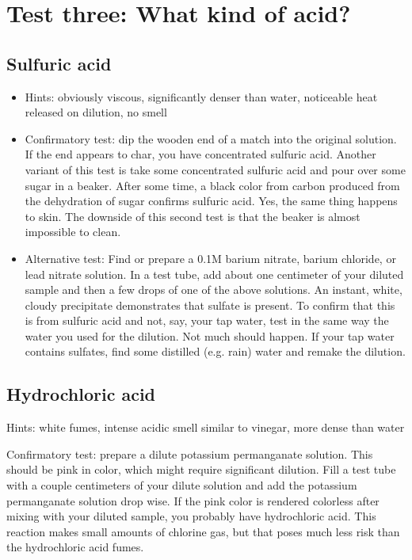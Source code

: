 \section{Test three: What kind of acid?}

\subsection{Sulfuric acid}
\begin{itemize}
\item{Hints: obviously viscous, 
significantly denser than water, 
noticeable heat released on dilution, 
no smell}

\item{Confirmatory test: dip the wooden end of a match into the original solution. 
If the end appears to char, 
you have concentrated sulfuric acid. 
Another variant of this test is take some concentrated sulfuric acid 
and pour over some sugar in a beaker. 
After some time, 
a black color from carbon produced 
from the dehydration of sugar confirms sulfuric acid. 
Yes, 
the same thing happens to skin. 
The downside of this second test is that the beaker 
is almost impossible to clean.}

\item{Alternative test: Find or prepare a 0.1M barium nitrate, 
barium chloride, 
or lead nitrate solution. 
In a test tube, 
add about one centimeter of your diluted sample 
and then a few drops of one of the above solutions. 
An instant, 
white, 
cloudy precipitate demonstrates that sulfate is present. 
To confirm that this is from sulfuric acid and not, 
say, 
your tap water, 
test in the same way the water you used for the dilution. 
Not much should happen. 
If your tap water contains sulfates, 
find some distilled (e.g. 
rain) water and remake the dilution.}
\end{itemize}

\subsection{Hydrochloric acid}
\item{Hints: white fumes, 
intense acidic smell similar to vinegar, 
more dense than water}

\item{Confirmatory test: 
prepare a dilute potassium permanganate solution. 
This should be pink in color, 
which might require significant dilution. 
Fill a test tube with a couple centimeters of your dilute solution 
and add the potassium permanganate solution drop wise. 
If the pink color is rendered colorless 
after mixing with your diluted sample, 
you probably have hydrochloric acid. 
This reaction makes small amounts of chlorine gas, 
but that poses much less risk than the hydrochloric acid fumes.}

